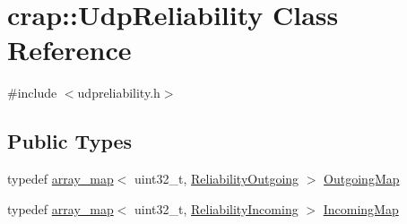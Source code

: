 \hypertarget{classcrap_1_1_udp_reliability}{}\section{crap\+:\+:Udp\+Reliability Class Reference}
\label{classcrap_1_1_udp_reliability}


{\ttfamily \#include $<$udpreliability.\+h$>$}

\subsection*{Public Types}
\begin{DoxyCompactItemize}
\item 
typedef \hyperlink{classcrap_1_1array__map}{array\+\_\+map}$<$ uint32\+\_\+t, \hyperlink{structcrap_1_1_reliability_outgoing}{Reliability\+Outgoing} $>$ \hyperlink{classcrap_1_1_udp_reliability_a8dde825107f0bdc30042114a16cb9dfe}{Outgoing\+Map}
\item 
typedef \hyperlink{classcrap_1_1array__map}{array\+\_\+map}$<$ uint32\+\_\+t, \hyperlink{structcrap_1_1_reliability_incoming}{Reliability\+Incoming} $>$ \hyperlink{classcrap_1_1_udp_reliability_aa39e31ccb6b2a80c031f959467e0c126}{Incoming\+Map}
\end{DoxyCompactItemize}
